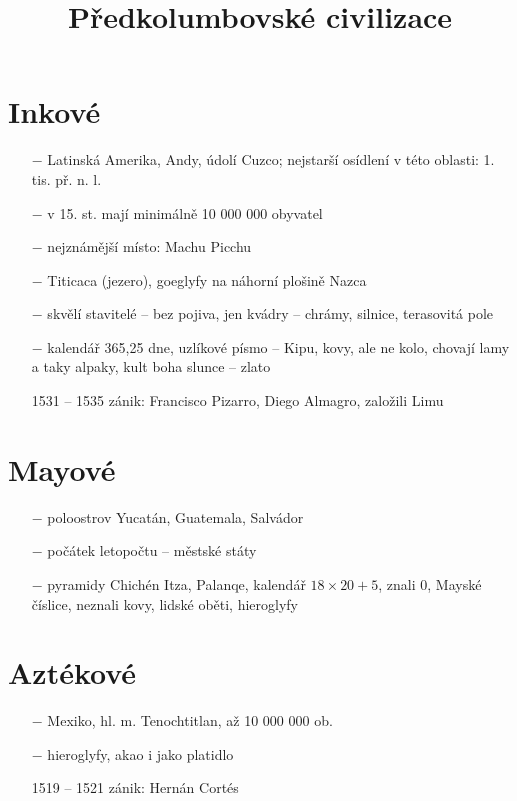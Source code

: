 \documentclass{article}
\title{\vspace{-2cm}Předkolumbovské civilizace\vspace{-1.7cm}}
\date{}
\author{}
\begin{document}
\maketitle

\section*{Inkové}
\begin{itemize}
    \vspace{-0.5em}
    \setlength\itemsep{0.15em}
    \item[$-$] Latinská Amerika, Andy, údolí Cuzco; nejstarší osídlení v této oblasti: 1. tis. př. n. l.
    \item[$-$] v 15. st. mají minimálně 10 000 000 obyvatel
    \item[$-$] nejznámější místo: Machu Picchu
    \item[$-$] Titicaca (jezero), goeglyfy na náhorní plošině Nazca
    \item[$-$] skvělí stavitelé -- bez pojiva, jen kvádry -- chrámy, silnice, terasovitá pole
    \item[$-$] kalendář 365,25 dne, uzlíkové písmo -- Kipu, kovy, ale ne kolo, chovají lamy a taky alpaky, kult boha slunce -- zlato
    \item[1531 -- 1535] zánik: Francisco Pizarro, Diego Almagro, založili Limu

\end{itemize}

\section*{Mayové}
\begin{itemize}
    \vspace{-0.5em}
    \setlength\itemsep{0.15em}
    \item[$-$] poloostrov Yucatán, Guatemala, Salvádor
    \item[$-$] počátek letopočtu -- městské státy
    \item[$-$] pyramidy Chichén Itza, Palanqe, kalendář $18 \times 20 + 5$, znali 0, Mayské číslice, neznali kovy, lidské oběti, hieroglyfy

\end{itemize}

\section*{Aztékové}
\begin{itemize}
    \vspace{-0.5em}
    \setlength\itemsep{0.15em}
    \item[$-$] Mexiko, hl. m. Tenochtitlan, až 10 000 000 ob.
    \item[$-$] hieroglyfy, akao i jako platidlo
    \item[1519 -- 1521] zánik: Hernán Cortés

\end{itemize}
\end{document}
